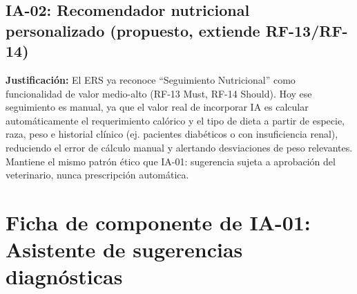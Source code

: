\subsection*{IA-02: Recomendador nutricional personalizado (propuesto, extiende RF-13/RF-14)}

\textbf{Justificación:} El ERS ya reconoce ``Seguimiento Nutricional'' como funcionalidad de valor medio-alto (RF-13 Must, RF-14 Should). Hoy ese seguimiento es manual, ya que el valor real de incorporar IA es calcular automáticamente el requerimiento calórico y el tipo de dieta a partir de especie, raza, peso e historial clínico (ej. pacientes diabéticos o con insuficiencia renal), reduciendo el error de cálculo manual y alertando desviaciones de peso relevantes. Mantiene el mismo patrón ético que IA-01: sugerencia sujeta a aprobación del veterinario, nunca prescripción automática.

\section{Ficha de componente de IA-01: Asistente de sugerencias diagnósticas}
\label{sec:ficha-ia01}

